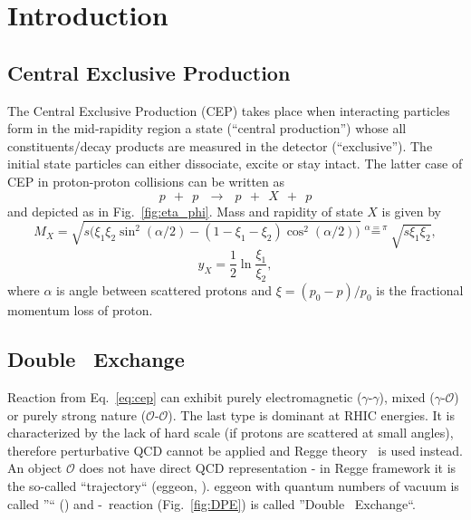 

\chapter{Introduction}\label{chap:introduction}

\section{Central Exclusive Production}
The Central Exclusive Production (CEP) takes place when interacting particles form in the mid-rapidity region a state (``central production'') whose all constituents/decay products are measured in the detector (``exclusive''). The initial state particles can either dissociate, excite or stay intact. The latter case of CEP in proton-proton collisions can be written as
\begin{equation}\label{eq:cep}%
p~~+~~p~~~\rightarrow~~~p~~+~~X~~+~~p
\end{equation}
and depicted as in Fig.~\ref{fig:eta_phi}. Mass and rapidity of state $X$ is given by
\begin{equation}\label{eq:mass_X}
M_{X} = \sqrt{s\Big(\xi_{1}\xi_{2}\sin^{2}{(\alpha/2)}-(1-\xi_{1}-\xi_{2})\cos^{2}{(\alpha/2)}\Big)} \stackrel{\alpha=\pi}{=} \sqrt{s\xi_{1}\xi_{2}},
\end{equation}\vspace{-10pt}
\begin{equation}\label{eq:rapidity_X}
y_{X} = \frac{1}{2}\ln{\frac{\xi_{1}}{\xi_{2}}},
\end{equation}
where $\alpha$ is angle between scattered protons and $\xi=(p_{0}-p)/p_{0}$ is the fractional momentum loss of proton.

\section{Double \Pomeron\  Exchange}
Reaction from Eq.~\ref{eq:cep} can exhibit purely electromagnetic ($\gamma$-$\gamma$), mixed ($\gamma$-$\mathcal{O}$) or purely strong nature ($\mathcal{O}$-$\mathcal{O}$). The last type is dominant at RHIC energies. It is characterized by the lack of hard scale (if protons are scattered at small angles), therefore perturbative QCD cannot be applied and Regge theory~\cite{IntroductionToRegge} is used instead. An object $\mathcal{O}$ does not have direct QCD representation - in Regge framework it is the so-called ``trajectory`` (\Reg eggeon, \Reg). \Reg eggeon with quantum numbers of vacuum is called ''\Pomeron`` (\Pom) and \Pom-\Pom\ reaction (Fig.~\ref{fig:DPE}) is called ''Double \Pomeron\  Exchange``. %

